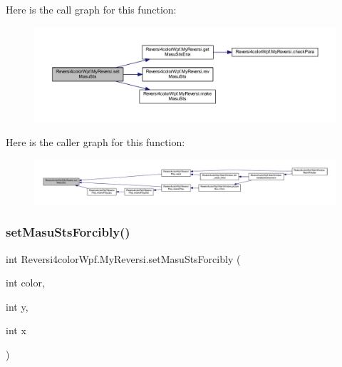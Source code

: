 Here is the call graph for this function\+:
\nopagebreak
\begin{figure}[H]
\begin{center}
\leavevmode
\includegraphics[width=350pt]{class_reversi4color_wpf_1_1_my_reversi_a6d87b374741e3548284d8effa0c7e0fd_cgraph}
\end{center}
\end{figure}
Here is the caller graph for this function\+:
\nopagebreak
\begin{figure}[H]
\begin{center}
\leavevmode
\includegraphics[width=350pt]{class_reversi4color_wpf_1_1_my_reversi_a6d87b374741e3548284d8effa0c7e0fd_icgraph}
\end{center}
\end{figure}
\mbox{\label{class_reversi4color_wpf_1_1_my_reversi_ac36c8b68028b3468cedc09454b118871}} 
\subsubsection{\texorpdfstring{set\+Masu\+Sts\+Forcibly()}{setMasuStsForcibly()}}
{\footnotesize\ttfamily int Reversi4color\+Wpf.\+My\+Reversi.\+set\+Masu\+Sts\+Forcibly (\begin{DoxyParamCaption}\item[{int}]{color,  }\item[{int}]{y,  }\item[{int}]{x }\end{DoxyParamCaption})}



